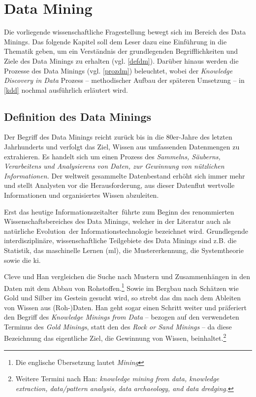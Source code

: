 \section{Data Mining}
\label{dm}
Die vorliegende wissenschaftliche Fragestellung bewegt sich im Bereich des Data Minings. Das folgende Kapitel soll dem Leser dazu eine Einführung in die Thematik geben, um ein Verständnis der grundlegenden Begrifflichkeiten und Ziele des Data Minings zu erhalten (vgl. \vref{defdm}). Darüber hinaus werden die Prozesse des Data Minings (vgl. \vref{prozdm}) beleuchtet, wobei der \textit{Knowledge Discovery in Data} Prozess -- methodischer Aufbau der späteren Umsetzung -- in \vref{kdd} nochmal ausführlich erläutert wird.

\subsection{Definition des Data Minings}
\label{defdm}

Der Begriff des Data Minings reicht zurück bis in die 80er-Jahre des letzten Jahrhunderts und verfolgt das Ziel, Wissen aus umfassenden Datenmengen zu extrahieren. Es handelt sich um einen Prozess des \glqq  \textit{Sammelns, Säuberns, Verarbeitens und Analysierens von Daten, zur Gewinnung von nützlichen Informationen.}\grqq{} Der weltweit gesammelte Datenbestand erhöht sich immer mehr und stellt Analysten vor die Herausforderung, aus dieser Datenflut wertvolle Informationen und organisiertes Wissen abzuleiten.

Erst das heutige \glqq Informationszeitalter\grqq~führte zum Beginn des renommierten Wissenschaftsbereiches des Data Minings, welcher in der Literatur auch als \glqq natürliche Evolution\grqq~der Informationstechnologie bezeichnet wird. Grundlegende interdisziplinäre, wissenschaftliche Teilgebiete des Data Minings sind z.B. die Statistik, das maschinelle Lernen (\gls{ml}), die Mustererkennung, die Systemtheorie sowie die \gls{ki}.


Cleve und Han vergleichen die Suche nach Mustern und Zusammenhängen in den Daten mit dem Abbau von Rohstoffen.\footnote{Die englische Übersetzung lautet \textit{\glqq Mining\grqq}} Sowie im Bergbau nach Schätzen wie Gold und Silber im Gestein gesucht wird, so strebt das \gls{dm} nach dem Ableiten von Wissen aus (Roh-)Daten. Han geht sogar einen Schritt weiter und präferiert den Begriff des \textit{Knowledge Minings from Data} -- bezogen auf den verwendeten Terminus des \textit{Gold Minings}, statt den des \textit{Rock or Sand Minings} -- da diese Bezeichnung das eigentliche Ziel, die Gewinnung von Wissen, beinhaltet.\footnote{Weitere Termini nach Han: \textit{knowledge mining from data, knowledge extraction, data/pattern analysis, data archaeology, and data dredging.}}

